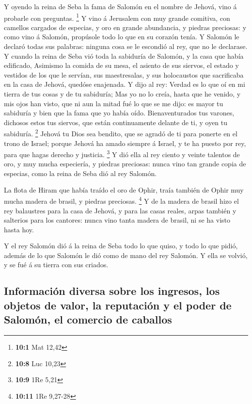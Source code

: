  Y oyendo la reina de Seba la fama de Salomón en el nombre
de Jehová, vino á probarle con preguntas. \footnote{\textbf{10:1} Mat
  12,42}  Y vino á Jerusalem con muy grande comitiva, con
camellos cargados de especias, y oro en grande abundancia, y piedras
preciosas: y como vino á Salomón, propúsole todo lo que en su corazón
tenía.  Y Salomón le declaró todas sus palabras: ninguna
cosa se le escondió al rey, que no le declarase.  Y cuando
la reina de Seba vió toda la sabiduría de Salomón, y la casa que había
edificado,  Asimismo la comida de su mesa, el asiento de sus
siervos, el estado y vestidos de los que le servían, sus maestresalas, y
sus holocaustos que sacrificaba en la casa de Jehová, quedóse enajenada.
 Y dijo al rey: Verdad es lo que oí en mi tierra de tus
cosas y de tu sabiduría;  Mas yo no lo creía, hasta que he
venido, y mis ojos han visto, que ni aun la mitad fué lo que se me dijo:
es mayor tu sabiduría y bien que la fama que yo había oído. 
Bienaventurados tus varones, dichosos estos tus siervos, que están
continuamente delante de ti, y oyen tu sabiduría. \footnote{\textbf{10:8}
  Luc 10,23}  Jehová tu Dios sea bendito, que se agradó de
ti para ponerte en el trono de Israel; porque Jehová ha amado siempre á
Israel, y te ha puesto por rey, para que hagas derecho y justicia.
\footnote{\textbf{10:9} 1Re 5,21}  Y dió ella al rey ciento
y veinte talentos de oro, y muy mucha especiería, y piedras preciosas:
nunca vino tan grande copia de especias, como la reina de Seba dió al
rey Salomón.

 La flota de Hiram que había traído el oro de Ophir, traía
también de Ophir muy mucha madera de brasil, y piedras preciosas.
\footnote{\textbf{10:11} 1Re 9,27-28}  Y de la madera de
brasil hizo el rey balaustres para la casa de Jehová, y para las casas
reales, arpas también y salterios para los cantores: nunca vino tanta
madera de brasil, ni se ha visto hasta hoy.

 Y el rey Salomón dió á la reina de Seba todo lo que quiso,
y todo lo que pidió, además de lo que Salomón le dió como de mano del
rey Salomón. Y ella se volvió, y se fué á su tierra con sus criados.

\hypertarget{informaciuxf3n-diversa-sobre-los-ingresos-los-objetos-de-valor-la-reputaciuxf3n-y-el-poder-de-salomuxf3n-el-comercio-de-caballos}{%
\subsection{Información diversa sobre los ingresos, los objetos de
valor, la reputación y el poder de Salomón, el comercio de
caballos}\label{informaciuxf3n-diversa-sobre-los-ingresos-los-objetos-de-valor-la-reputaciuxf3n-y-el-poder-de-salomuxf3n-el-comercio-de-caballos}}

